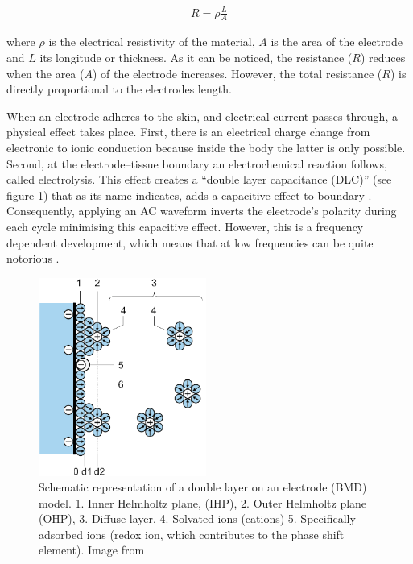 \begin{align}
	\label{eq:resist}
	R = \rho \frac{L}{A}
\end{align}

where $\rho$ is the electrical resistivity of the material, $A$ is the area of the electrode and $L$ its longitude or thickness. As it can be noticed, the resistance ($R$) reduces when the area ($A$) of the electrode increases. However, the total resistance ($R$) is directly proportional to the electrodes length. 

When an electrode adheres to the skin, and electrical current passes through, a physical effect takes place. First, there is an electrical charge change from electronic to ionic conduction because inside the body the latter is only possible. Second, at the electrode–tissue boundary an electrochemical reaction follows, called electrolysis. This effect creates a “double layer capacitance (DLC)” (see figure \ref{fig:DLC}) that as its name indicates, adds a capacitive effect to boundary \cite{lvovich2012impedance}. Consequently, applying an AC waveform inverts the electrode’s polarity during each cycle minimising this capacitive effect. However, this is a frequency dependent development, which means that at low frequencies can be quite notorious \cite{bertemes2002tissue}.  

\begin{figure}[!htpb]
	\centering
	\includegraphics[width=5.5cm,keepaspectratio]{figure7}    
	\caption[Dual layer representation on an electrode]{Schematic representation of a double layer on an electrode (BMD) model. 1. Inner Helmholtz plane, (IHP), 2. Outer Helmholtz plane (OHP), 3. Diffuse layer, 4. Solvated ions (cations) 5. Specifically adsorbed ions (redox ion, which contributes to the phase shift element). Image from \cite{lvovich2012impedance}}
	\label{fig:DLC}
\end{figure}

